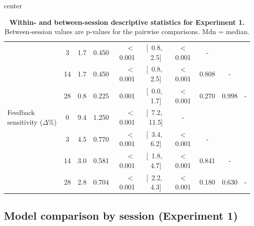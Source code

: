 \documentclass[a4paper,12pt]{article}
\begin{document}
\begin{refsection}[supp]
\begin{table}[h!]
\begin{adjustbox}{center}
\begin{tabular}{lcrrrccccc}
                                &  3   & 1.7 & 0.450 &  $<$0.001 & [\ 0.8, \ 2.5] & $<$0.001 & -     &       &   \\
                                & 14 & 1.7 & 0.450 &  $<$0.001 & [\ 0.8, \ 2.5] & $<$0.001 & 0.808 & -     &   \\
                                & 28 & 0.8 & 0.225 & 0.001 & [\ 0.0, \ 1.7] & $<$0.001 & 0.270 & 0.998 & - \\
        \midrule
        \footnotesize Feedback  sensitivity ($\Delta$\%) &  0 & 9.4 & 1.250 & $<$0.001 & [\ 7.2, \ 11.5] &        - &       &       &   \\
         &  3 & 4.5 & 0.770 & $<$0.001 & [\ 3.4, \ 6.2] & $<$0.001 & -     &       &   \\
                                          & 14 & 3.0 & 0.581 & $<$0.001 & [\ 1.8, \ 4.7] & $<$0.001 & 0.841 & -     &   \\
                                          & 28 & 2.8 & 0.704 & $<$0.001 & [\ 2.2, \ 4.3] & $<$0.001 & 0.180 & 0.630 & - \\
        \bottomrule
    \end{tabular}
    \end{adjustbox}
    \caption{{\bf Within- and between-session descriptive statistics for Experiment 1.} Between-session values are p-values for the pairwise comparisons. Mdn = median.}
    \label{tab:stats_exp01}
\end{table}

\clearpage
\subsection*{Model comparison by session (Experiment 1)}


\end{refsection}
\end{document}
